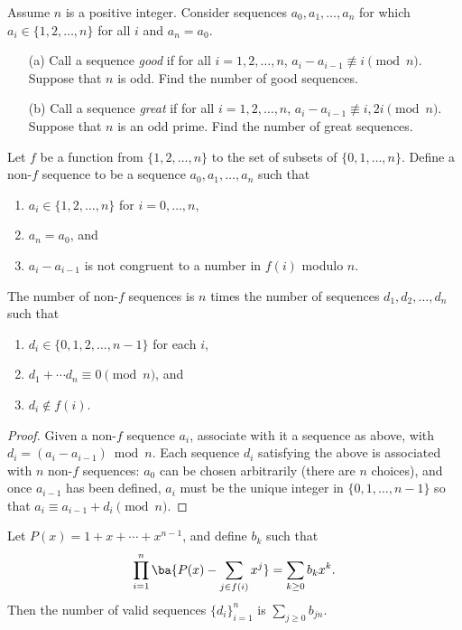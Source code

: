\begin{ex}[TST 2004/2]
Assume $n$ is a positive integer. Consider sequences $a_0,a_1,\ldots, a_n$ for which $a_i\in \{1,2,\ldots, n\}$ for all $i$ and $a_n=a_0$.
\begin{enumerate}
\item[(a)]
Call a sequence {\it good} if for all $i=1,2,\ldots, n$, $a_i-a_{i-1}\not\equiv i\pmod n$. Suppose that $n$ is odd. Find the number of good sequences.
\item[(b)]
Call a sequence {\it great} if for all $i=1,2,\ldots, n$, $a_i-a_{i-1}\not\equiv i,2i\pmod n$. Suppose that $n$ is an odd prime. Find the number of great sequences.
\end{enumerate}
\end{ex}
Let $f$ be a function from $\{1,2,\ldots, n\}$ to the set of subsets of $\{0,1,\ldots, n\}$. Define a non-$f$ sequence to be a sequence $a_0,a_1,\ldots, a_n$ such that 
\begin{enumerate}
\item $a_i\in \{1,2,\ldots, n\}$ for $i=0,\ldots, n$,
\item $a_n=a_0$, and
\item $a_i-a_{i-1}$ is not congruent to a number in $f(i)$ modulo $n$.
\end{enumerate}
\begin{clm}
The number of non-$f$ sequences is $n$ times the number of sequences $d_1,d_2,\ldots, d_{n}$ such that
\begin{enumerate}
\item  $d_i\in \{0,1,2,\ldots, n-1\}$ for each $i$,
\item $d_1+\cdots d_n\equiv 0\pmod n$, and
\item $d_i\nin f(i)$.
\end{enumerate}
\end{clm}
\begin{proof}
Given a non-$f$ sequence $a_i$, associate with it a sequence as above, with $d_i=(a_{i}-a_{i-1})\bmod n$. Each sequence $d_i$ satisfying the above is associated with $n$ non-$f$ sequences: $a_0$ can be chosen arbitrarily (there are $n$ choices), and once $a_{i-1}$ has been defined, $a_{i}$ must be the unique integer in $\{0,1,\ldots, n-1\}$ so that $a_{i}\equiv a_{i-1}+d_i\pmod n$.
\end{proof}
\begin{clm}
Let $P(x)=1+x+\cdots +x^{n-1}$, and define $b_k$ such that
\[
\prod_{i=1}^n\ba{P(x)-\sum_{j\in f(i)}x^j}=\sum_{k\geq 0} b_k x^k.
\]
Then the number of valid sequences $\{d_i\}_{i=1}^{n}$ is $\sum_{j\geq 0} b_{jn}$. 
\end{clm}

